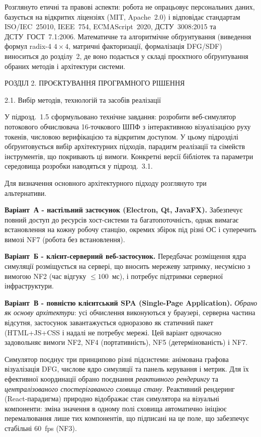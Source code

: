 \documentclass[
]{article}
\begin{document}
Розглянуто етичні та правові аспекти: робота не опрацьовує персональних
даних, базується на відкритих ліцензіях (MIT, Apache~2.0) і відповідає
стандартам ISO/IEC~25010, IEEE~754, ECMAScript~2020, ДСТУ~3008:2015 та
ДСТУ~ГОСТ~7.1:2006. Математичне та алгоритмічне обґрунтування (виведення
формул radix-4 \(4 \times 4\), матричні факторизації, формалізація
DFG/SDF) виноситься до розділу~2, де воно подається у складі проєктного
обґрунтування обраних методів і архітектури системи.

\protect{}\label{_Toc228121443}{}РОЗДІЛ 2. ПРОЄКТУВАННЯ
ПРОГРАМНОГО РІШЕННЯ

\protect{}\label{_Toc228121444}{}2.1. Вибір методів,
технологій та засобів реалізації

У підрозд.~1.5 сформульовано технічне завдання: розробити веб-симулятор
потокового обчислювача 16-точкового ШПФ з інтерактивною візуалізацією
руху токенів, числовою верифікацією та відкритим доступом. У цьому
підрозділі обґрунтовується вибір архітектурних підходів, парадигм
реалізації та сімейств інструментів, що покривають ці вимоги. Конкретні
версії бібліотек та параметри середовища розробки наводяться у
підрозд.~3.1.

Для визначення основного архітектурного підходу розглянуто три\\
альтернативи.

\textbf{Варіант~А - настільний застосунок (Electron, Qt, JavaFX).}
Забезпечує повний доступ до ресурсів хост-системи та багатопоточність,
однак вимагає встановлення на кожну робочу станцію, окремих збірок під
різні ОС і суперечить вимозі NF7 (робота без встановлення).

\textbf{Варіант~Б - клієнт-серверний веб-застосунок.} Передбачає
розміщення ядра симуляції розміщується на сервері, що вносить мережеву
затримку, несумісно з вимогою NF2 (час відгуку \(\leq 100\)~мс), і
потребує підтримки серверної інфраструктури.

\textbf{Варіант~В - повністю клієнтський SPA (Single-Page Application).}
\emph{Обрано як основу архітектури}: усі обчислення виконуються у
браузері, серверна частина відсутня, застосунок завантажується
одноразово як статичний пакет (HTML+JS+CSS і надалі не потребує мережі.
Цей варіант одночасно задовольняє вимоги NF2, NF4 (портативність), NF5
(детермінованість) і NF7.

Симулятор поєднує три принципово різні підсистеми: анімована графова
візуалізація DFG, числове ядро симуляції та панель керування і метрик.
Для їх ефективної координації обрано поєднання \emph{реактивного
рендерингу} та \emph{централізованого спостерігаваного сховища стану}.
Реактивний рендеринг (React-парадигма) природно відображає стан
симулятора на візуальні компоненти: зміна значення в одному полі сховища
автоматично ініціює перемалювання лише тих компонентів, що підписані на
це поле, що забезпечує стабільні 60~fps (NF3).
\end{document}
